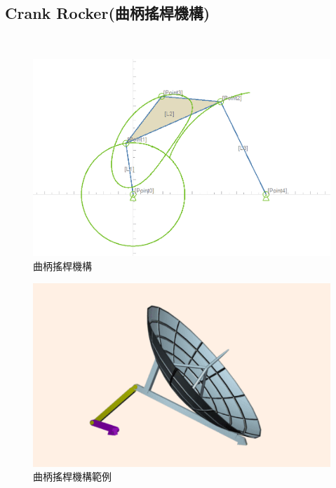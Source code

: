 \documentclass[14pt,a4paper]{report}  %
\newcommand{\fourteen}{\fontsize{14pt}{\baselineskip}\selectfont}%
\begin{document}
    
       \hspace*{\fill} \\
       \subsection{Crank Rocker(曲柄搖桿機構)}
       \hspace*{\fill} \\        
        \fourteen {為4個連桿、5個接頭，2個雙接頭連桿、1個三接頭連桿所組成，如圖(5.3)，曲柄旋轉運動透過連接桿轉換至搖桿的搖擺運動，此四連桿機構構造最簡單也最常在生活周遭出現，如:老虎鉗、雷達調整機構、縫紉機腳踏機構、鋼材輸送機，如圖(5.4)。}
     \begin{figure}[H]
        \centering
        \includegraphics[scale=0.5]{曲柄搖桿機構.png} 
        \caption{曲柄搖桿機構} %
        \label{fig:scale} %
    \end{figure}
    \begin{figure}[H]
        \centering
        \includegraphics[scale=0.6]{曲柄搖桿機構範例.png} 
        \caption{曲柄搖桿機構範例} %
        \label{fig:scale} %
    \end{figure}
    
\end{document}
